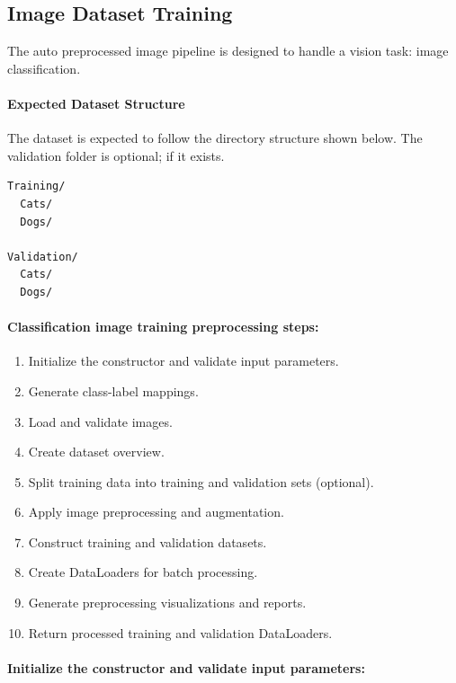 \subsection{Image Dataset Training}
The auto preprocessed image pipeline is designed to handle a vision task: image classification.
\vspace{1cm}
\paragraph{Expected Dataset Structure}
The dataset is expected to follow the directory structure shown below. The validation folder is optional; if it exists.
\begin{verbatim}
Training/
  Cats/
  Dogs/

Validation/
  Cats/
  Dogs/
\end{verbatim}


\vspace{1cm}
\paragraph{Classification image training preprocessing steps:}\par
\begin{enumerate}
\item Initialize the constructor and validate input parameters.
  \item Generate class-label mappings.
    \item Load and validate images.
    \item Create dataset overview.
    \item Split training data into training and validation sets (optional).
    \item Apply image preprocessing and augmentation.
    \item Construct training and validation datasets.
    \item Create DataLoaders for batch processing.
    \item Generate preprocessing visualizations and reports.
    \item Return processed training and validation DataLoaders.
\end{enumerate}

\vspace{1cm}
\paragraph{Initialize the constructor and validate input parameters:}\par

